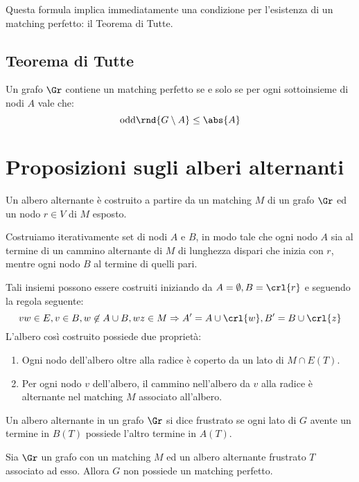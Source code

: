 \documentclass[\main/main.tex]{subfiles}
\begin{document}
Questa formula implica immediatamente una condizione per l'esistenza di un matching perfetto: il Teorema di Tutte.

\subsection{Teorema di Tutte}
\begin{theorem}
	Un grafo \(\Gr \) contiene un matching perfetto se e solo se per ogni sottoinsieme di nodi \(A\) vale che:
	\[
		\text{odd}\rnd{G\setminus A} \leq \abs{A}
	\]
\end{theorem}
\clearpage
\section{Proposizioni sugli alberi alternanti}
\begin{definition}
	Un albero alternante è costruito a partire da un matching \(M\) di un grafo \(\Gr \) ed un nodo \(r \in V\) di \(M\) esposto.

	Costruiamo iterativamente set di nodi \(A\) e \(B\), in modo tale che ogni nodo \(A\) sia al termine di un cammino alternante di \(M\) di lunghezza dispari che inizia con \(r\), mentre ogni nodo \(B\) al termine di quelli pari.

	Tali insiemi possono essere costruiti iniziando da \(A=\emptyset, B=\crl{r}\) e seguendo la regola seguente:
	\[
		vw \in E, v \in B, w \not\in A \cup B, wz \in M \Rightarrow A' = A \cup \crl{w}, B' = B \cup \crl{z}
	\]
	L'albero così costruito possiede due proprietà:
	\begin{enumerate}
		\item Ogni nodo dell'albero oltre alla radice è coperto da un lato di \(M \cap E(T)\).
		\item Per ogni nodo \(v\) dell'albero, il cammino nell'albero da \(v\) alla radice è alternante nel matching \(M\) associato all'albero.
	\end{enumerate}
\end{definition}
\begin{definition}
	Un albero alternante in un grafo \(\Gr \) si dice frustrato se ogni lato di \(G\) avente un termine in \(B(T)\) possiede l'altro termine in \(A(T)\).
\end{definition}
\begin{proposition}
	Sia \(\Gr \) un grafo con un matching \(M\) ed un albero alternante frustrato \(T\) associato ad esso. Allora \(G\) non possiede un matching perfetto.
\end{proposition}
\end{document}
